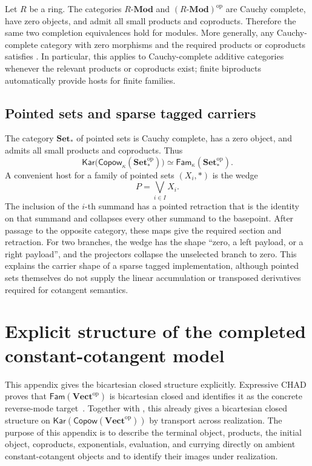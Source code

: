 \documentclass[runningheads,envcountsame]{llncs}
\newcommand{\Setstar}{\mathbf{Set}_{*}}
\newcommand{\Vectop}{\mathbf{Vect}^{\mathrm{op}}}
\newcommand{\Copow}{\mathsf{Copow}}
\newcommand{\Fam}{\mathsf{Fam}}
\newcommand{\Kar}{\mathsf{Kar}}
\begin{document}
Let $R$ be a ring. The categories $R\text{-}\mathbf{Mod}$ and
$(R\text{-}\mathbf{Mod})^{\mathrm{op}}$ are Cauchy complete, have zero
objects, and admit all small products and coproducts. Therefore the same two
completion equivalences hold for modules. More generally, any Cauchy-complete
category with zero morphisms and the required products or coproducts satisfies
. In particular, this applies to
Cauchy-complete additive categories whenever the relevant products or
coproducts exist; finite biproducts automatically provide hosts for finite
families.

\subsection{Pointed sets and sparse tagged carriers}

The category $\Setstar$ of pointed sets is Cauchy complete, has a zero object,
and admits all small products and coproducts. Thus
$$
\Kar\bigl(\Copow_\kappa(\Setstar^{\mathrm{op}})\bigr)
\simeq
\Fam_\kappa(\Setstar^{\mathrm{op}}).
$$
A convenient host for a family of pointed sets $(X_i,*)$ is the wedge
$$
P=\bigvee_{i\in I}X_i.
$$
The inclusion of the $i$-th summand has a pointed retraction that is the
identity on that summand and collapses every other summand to the basepoint.
After passage to the opposite category, these maps give the required section
and retraction. For two branches, the wedge has the shape ``zero, a left
payload, or a right payload'', and the projectors collapse the unselected
branch to zero. This explains the carrier shape of a sparse tagged
implementation, although pointed sets themselves do not supply the linear
accumulation or transposed derivatives required for cotangent semantics.

\section{Explicit structure of the completed constant-cotangent model}
\label{app:concrete-bcc}

This appendix gives the bicartesian closed structure explicitly. Expressive
CHAD proves that $\Fam(\Vectop)$ is bicartesian closed and identifies it as
the concrete reverse-mode target~\cite[Section~10.2, Corollary~82, and
Equation~(68)]{LucatelliNunesVakar2023}. Together with
, this already gives a bicartesian closed structure on
$\Kar(\Copow(\Vectop))$ by transport across realization. The purpose of
this appendix is to describe the terminal object, products, the initial object,
coproducts, exponentials, evaluation, and currying directly on ambient
constant-cotangent objects and to identify their images under realization.
\end{document}
